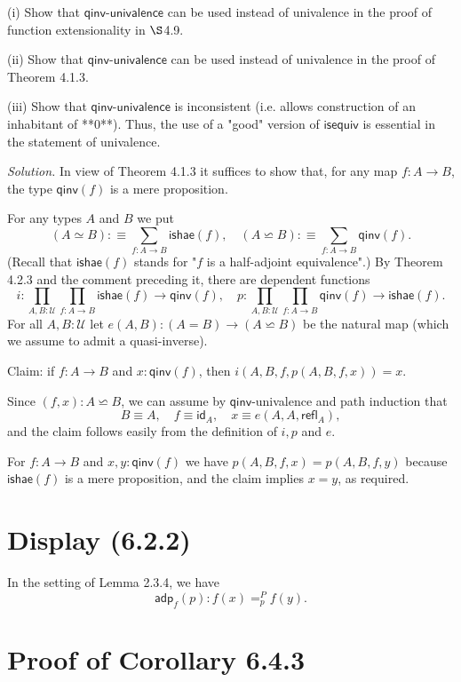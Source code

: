 \documentclass[12pt]{article}
\newcommand{\msf}{\mathsf}
\newcommand{\nn}{\noindent}
\begin{document}
\nn(i) Show that $\mathsf{qinv}$-$\mathsf{univalence}$ can be used instead of univalence in the proof of function extensionality in $\S$4.9.

\nn(ii) Show that $\mathsf{qinv}$-$\mathsf{univalence}$ can be used instead of univalence in the proof of Theorem 4.1.3.

\nn(iii) Show that $\mathsf{qinv}$-$\mathsf{univalence}$ is inconsistent (i.e. allows construction of an inhabitant of **0**). Thus, the use of a "good" version of $\mathsf{isequiv}$ is essential in the statement of univalence.

\nn\emph{Solution.} In view of Theorem 4.1.3 it suffices to show that, for any map $f:A\to B$, the type $\mathsf{qinv}(f)$ is a mere proposition. 

For any types $A$ and $B$ we put 
$$
(A\simeq B):\equiv\sum_{f:A\to B}\mathsf{ishae}(f),\quad(A\backsimeq B):\equiv\sum_{f:A\to B}\mathsf{qinv}(f).
$$ 
(Recall that $\mathsf{ishae}(f)$ stands for "$f$ is a half-adjoint equivalence".) By Theorem 4.2.3 and the comment preceding it, there are dependent functions 
$$
i:\prod_{A,B:\mathcal U}\prod_{f:A\to B}\mathsf{ishae}(f)\to\mathsf{qinv}(f),\quad p:\prod_{A,B:\mathcal U}\prod_{f:A\to B}\mathsf{qinv}(f)\to\mathsf{ishae}(f).
$$ 
For all $A,B:\mathcal U$ let $e(A,B):(A=B)\to(A\backsimeq B)$ be the natural map (which we assume to admit a quasi-inverse).

Claim: if $f:A\to B$ and $x:\mathsf{qinv}(f)$, then $i(A,B,f,p(A,B,f,x))=x$.
 
Since $(f,x):A\backsimeq B$, we can assume by $\mathsf{qinv}$-univalence and path induction that 
$$
B\equiv A,\quad f\equiv\mathsf{id}_A,\quad x\equiv e(A,A,\mathsf{refl}_A),
$$ 
and the claim follows easily from the definition of $i,p$ and $e$.

For $f:A\to B$ and $x,y:\mathsf{qinv}(f)$ we have $p(A,B,f,x)=p(A,B,f,y)$ because $\mathsf{ishae}(f)$ is a mere proposition, and the claim implies $x=y$, as required.


\section{Display (6.2.2)}

In the setting of Lemma 2.3.4, we have 
$$
\msf{adp}_f(p):f(x)=^P_pf(y).
$$


\section{Proof of Corollary 6.4.3}
\end{document}
